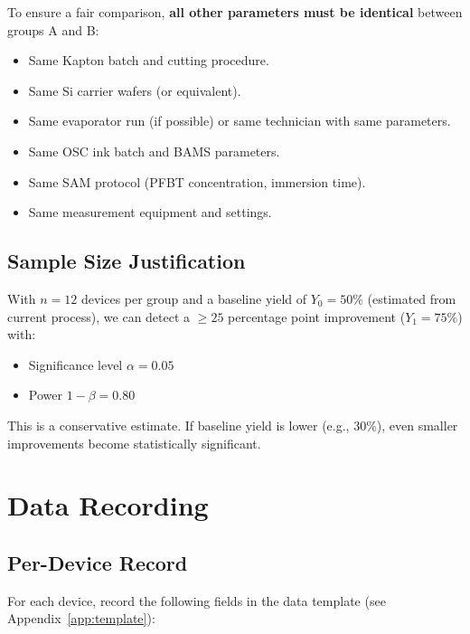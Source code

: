 \documentclass[11pt,a4paper]{article}
\begin{document}
\begin{warningbox}
To ensure a fair comparison, \textbf{all other parameters must be
identical} between groups A and B:
\begin{itemize}
    \item Same Kapton batch and cutting procedure.
    \item Same Si carrier wafers (or equivalent).
    \item Same evaporator run (if possible) or same technician with same
          parameters.
    \item Same OSC ink batch and BAMS parameters.
    \item Same SAM protocol (PFBT concentration, immersion time).
    \item Same measurement equipment and settings.
\end{itemize}
\end{warningbox}

\subsection{Sample Size Justification}

With $n = 12$ devices per group and a baseline yield of $Y_0 = 50\%$
(estimated from current process), we can detect a $\geq 25$ percentage
point improvement ($Y_1 = 75\%$) with:
\begin{itemize}
    \item Significance level $\alpha = 0.05$
    \item Power $1 - \beta = 0.80$
\end{itemize}

This is a conservative estimate. If baseline yield is lower (e.g., 30\%),
even smaller improvements become statistically significant.

\section{Data Recording}

\subsection{Per-Device Record}

For each device, record the following fields in the data template
(see Appendix~\ref{app:template}):
\end{document}
